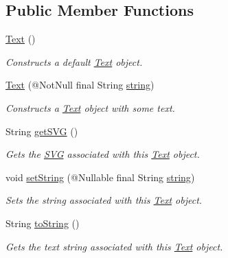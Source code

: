 \subsection*{Public Member Functions}
\begin{DoxyCompactItemize}
\item 
\hyperlink{classcom_1_1aarrelaakso_1_1drawl_1_1_text_a9d9bdd3df91ff551c7bf96f741cde0e9}{Text} ()
\begin{DoxyCompactList}\small\item\em Constructs a default \hyperlink{classcom_1_1aarrelaakso_1_1drawl_1_1_text}{Text} object. \end{DoxyCompactList}\item 
\hyperlink{classcom_1_1aarrelaakso_1_1drawl_1_1_text_a8a30634e847c9c235c97aa3c20f991b7}{Text} (@Not\+Null final String \hyperlink{classcom_1_1aarrelaakso_1_1drawl_1_1_text_a94bf15b06c72349f5d5a1bfc56496685}{string})
\begin{DoxyCompactList}\small\item\em Constructs a \hyperlink{classcom_1_1aarrelaakso_1_1drawl_1_1_text}{Text} object with some text. \end{DoxyCompactList}\item 
String \hyperlink{classcom_1_1aarrelaakso_1_1drawl_1_1_text_ab1a6091b007ea4da41de26bc8c6ea021}{get\+S\+VG} ()
\begin{DoxyCompactList}\small\item\em Gets the \hyperlink{classcom_1_1aarrelaakso_1_1drawl_1_1_s_v_g}{S\+VG} associated with this \hyperlink{classcom_1_1aarrelaakso_1_1drawl_1_1_text}{Text} object. \end{DoxyCompactList}\item 
void \hyperlink{classcom_1_1aarrelaakso_1_1drawl_1_1_text_a8fec7a478b7a7f4a141e36ee52a66a42}{set\+String} (@Nullable final String \hyperlink{classcom_1_1aarrelaakso_1_1drawl_1_1_text_a94bf15b06c72349f5d5a1bfc56496685}{string})
\begin{DoxyCompactList}\small\item\em Sets the string associated with this \hyperlink{classcom_1_1aarrelaakso_1_1drawl_1_1_text}{Text} object. \end{DoxyCompactList}\item 
String \hyperlink{classcom_1_1aarrelaakso_1_1drawl_1_1_text_aaded65428b035e05b91e65f21808b434}{to\+String} ()
\begin{DoxyCompactList}\small\item\em Gets the text string associated with this \hyperlink{classcom_1_1aarrelaakso_1_1drawl_1_1_text}{Text} object. \end{DoxyCompactList}\item 

\end{DoxyCompactItemize}
